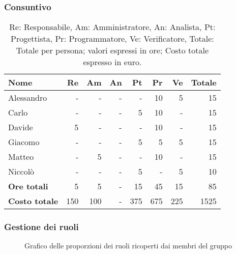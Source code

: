 \subsubsection{Consuntivo}
\begin{table}[H]
	\centering
	\begin{tabular}{l|r|r|r|r|r|r|r}
		\textbf{Nome}         & \textbf{Re} & \textbf{Am} & \textbf{An} & \textbf{Pt} & \textbf{Pr} & \textbf{Ve} & \textbf{Totale} \\
		\hline
		Alessandro            & -           & -           & -           & -           & 10          & 5           & 15              \\
		Carlo                 & -           & -           & -           & 5           & 10          & -           & 15              \\
		Davide                & 5           & -           & -           & -           & 10          & -           & 15              \\
		Giacomo               & -           & -           & -           & 5           & 5           & 5           & 15              \\
		Matteo                & -           & 5           & -           & -           & 10          & -           & 15              \\
		Niccolò               & -           & -           & -           & 5           & -           & 5           & 10              \\
		\hline
		\textbf{Ore totali}   & 5           & 5           & -           & 15          & 45          & 15          & 85              \\
		\textbf{Costo totale} & 150         & 100         & -           & 375         & 675         & 225         & 1525
	\end{tabular}
	\caption{Re: Responsabile, Am: Amministratore, An: Analista, Pt: Progettista,
		Pr: Programmatore, Ve: Verificatore, Totale: Totale per persona; valori espressi in ore; Costo totale espresso in euro.}
\end{table}

\subsubsection{Gestione dei ruoli}
\begin{figure}[h]
	\centering
	\caption{Grafico delle proporzioni dei ruoli ricoperti dai membri del gruppo}
\end{figure}

